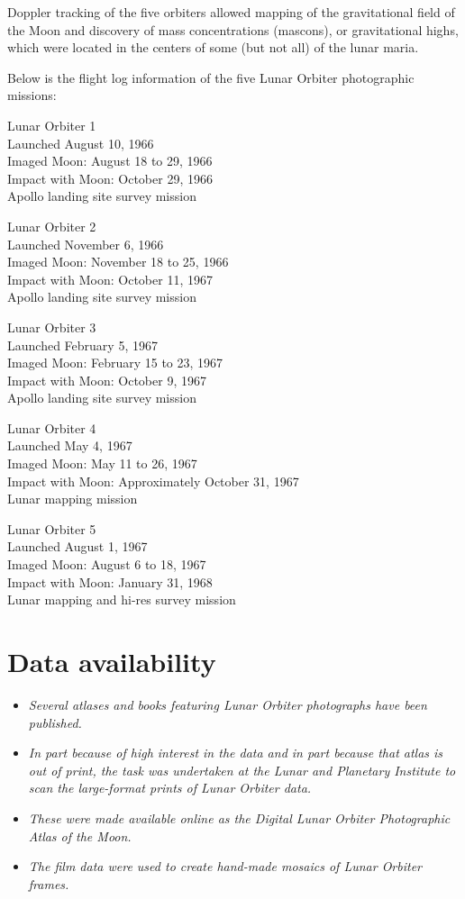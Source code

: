 Doppler tracking of the five orbiters allowed mapping of the
gravitational field of the Moon and discovery of mass concentrations
(mascons), or gravitational highs, which were located in the centers of
some (but not all) of the lunar maria.

Below is the flight log information of the five Lunar Orbiter
photographic missions:

Lunar Orbiter 1\\
Launched August 10, 1966\\
Imaged Moon: August 18 to 29, 1966\\
Impact with Moon: October 29, 1966\\
Apollo landing site survey mission

Lunar Orbiter 2\\
Launched November 6, 1966\\
Imaged Moon: November 18 to 25, 1966\\
Impact with Moon: October 11, 1967\\
Apollo landing site survey mission

Lunar Orbiter 3\\
Launched February 5, 1967\\
Imaged Moon: February 15 to 23, 1967\\
Impact with Moon: October 9, 1967\\
Apollo landing site survey mission

Lunar Orbiter 4\\
Launched May 4, 1967\\
Imaged Moon: May 11 to 26, 1967\\
Impact with Moon: Approximately October 31, 1967\\
Lunar mapping mission

Lunar Orbiter 5\\
Launched August 1, 1967\\
Imaged Moon: August 6 to 18, 1967\\
Impact with Moon: January 31, 1968\\
Lunar mapping and hi-res survey mission

\section{Data availability}\label{data-availability}

\begin{itemize}
\item
  \emph{Several atlases and books featuring Lunar Orbiter photographs
  have been published.}
\item
  \emph{In part because of high interest in the data and in part because
  that atlas is out of print, the task was undertaken at the Lunar and
  Planetary Institute to scan the large-format prints of Lunar Orbiter
  data.}
\item
  \emph{These were made available online as the Digital Lunar Orbiter
  Photographic Atlas of the Moon.}
\item
  \emph{The film data were used to create hand-made mosaics of Lunar
  Orbiter frames.}
\end{itemize}

